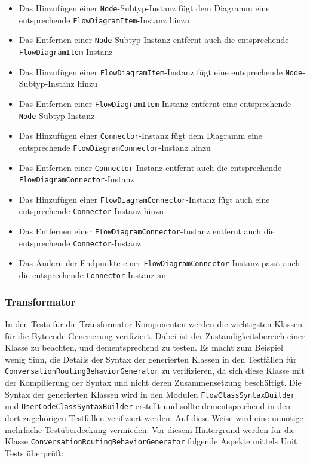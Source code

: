 \begin{itemize}
\item Das Hinzufügen einer \texttt{Node}-Subtyp-Instanz fügt dem Diagramm eine entsprechende \texttt{Flow\-Dia\-gram\-Item}-In\-stanz hinzu
\item Das Entfernen einer \texttt{Node}-Subtyp-Instanz entfernt auch die entsprechende \texttt{Flow\-Dia\-gram\-Item}-In\-stanz
\item Das Hinzufügen einer \texttt{FlowDiagramItem}-Instanz fügt eine entsprechende \texttt{Node}-Subtyp-Instanz hinzu
\item Das Entfernen einer \texttt{FlowDiagramItem}-Instanz entfernt eine entsprechende \texttt{Node}-Subtyp-Instanz
\item Das Hinzufügen einer \texttt{Connector}-Instanz fügt dem Diagramm eine entsprechende \texttt{Flow\-Dia\-gram\-Con\-nec\-tor}-In\-stanz hinzu
\item Das Entfernen einer \texttt{Connector}-Instanz entfernt auch die entsprechende \texttt{Flow\-Dia\-gram\-Con\-nec\-tor}-In\-stanz
\item Das Hinzufügen einer \texttt{FlowDiagramConnector}-Instanz fügt auch eine entsprechende \texttt{Connector}-Instanz hinzu
\item Das Entfernen einer \texttt{FlowDiagramConnector}-Instanz entfernt auch die entsprechende \texttt{Connector}-Instanz
\item Das Ändern der Endpunkte einer \texttt{FlowDiagramConnector}-Instanz passt auch die entsprechende \texttt{Connector}-Instanz an
\end{itemize} 

\subsubsection{Transformator}  
In den Tests für die Transformator-Komponenten werden die wichtigsten Klassen für die Bytecode-Generierung verifiziert. Dabei ist der Zuständigkeitsbereich einer Klasse zu beachten, und dementsprechend zu testen. Es macht zum Beispiel wenig Sinn, die Details der Syntax der generierten Klassen in den Testfällen für \texttt{ConversationRoutingBehaviorGenerator} zu verifizieren, da sich diese Klasse mit der Kompilierung der Syntax und nicht deren Zusammensetzung beschäftigt. Die Syntax der generierten Klassen wird in den Modulen \texttt{FlowClassSyntaxBuilder} und \texttt{UserCodeClassSyntaxBuilder} erstellt und sollte dementsprechend in den dort zugehörigen Testfällen verifiziert werden. Auf diese Weise wird eine unnötige mehrfache Testüberdeckung vermieden. Vor diesem Hintergrund werden für die Klasse \texttt{ConversationRoutingBehaviorGenerator} folgende Aspekte mittels Unit Tests überprüft: 


